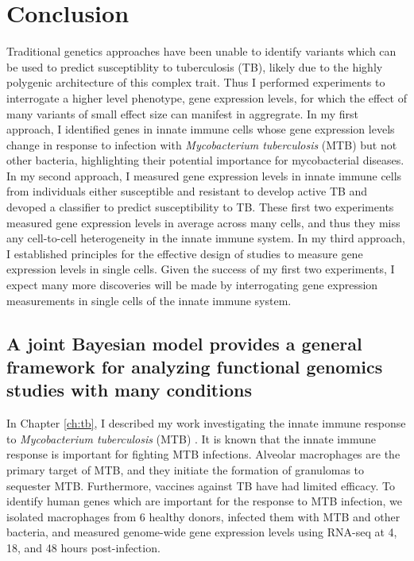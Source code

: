 \chapter{Conclusion}\label{conclusion}

Traditional genetics approaches have been unable to identify variants
which can be used to predict susceptiblity to tuberculosis (TB),
likely due to the highly polygenic architecture of this complex trait.
Thus I performed experiments to interrogate a higher level phenotype,
gene expression levels, for which the effect of many variants of small
effect size can manifest in aggregrate. In my first approach, I
identified genes in innate immune cells whose gene expression levels
change in response to infection with \emph{Mycobacterium tuberculosis}
(MTB) but not other bacteria, highlighting their potential importance
for mycobacterial diseases. In my second approach, I measured gene
expression levels in innate immune cells from individuals either
susceptible and resistant to develop active TB and devoped a
classifier to predict susceptibility to TB. These first two
experiments measured gene expression levels in average across many
cells, and thus they miss any cell-to-cell heterogeneity in the innate
immune system. In my third approach, I established principles for the
effective design of studies to measure gene expression levels in
single cells. Given the success of my first two experiments, I expect
many more discoveries will be made by interrogating gene expression
measurements in single cells of the innate immune system.

\section{A joint Bayesian model provides a general framework for analyzing functional genomics studies with many conditions}

In Chapter \ref{ch:tb}, I described my work investigating the innate immune
response to \emph{Mycobacterium tuberculosis} (MTB) \citep{Blischak2015}. It is
known that the innate immune response is important for fighting MTB
infections. Alveolar macrophages are the primary target of MTB, and they
initiate the formation of granulomas to sequester MTB. Furthermore, vaccines
against TB have had limited efficacy. To identify human genes which are
important for the response to MTB infection, we isolated macrophages from 6
healthy donors, infected them with MTB and other bacteria, and measured
genome-wide gene expression levels using RNA-seq at 4, 18, and 48 hours
post-infection.

